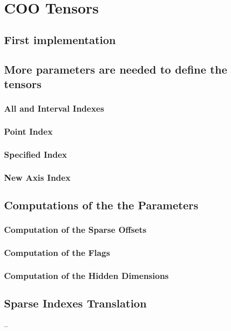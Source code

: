 \section{COO Tensors}
\subsection{First implementation}

\subsection{More parameters are needed to define the tensors}
\subsubsection{All and Interval Indexes}
\subsubsection{Point Index}
\subsubsection{Specified Index}
\subsubsection{New Axis Index}

\subsection{Computations of the the Parameters}
\subsubsection{Computation of the Sparse Offsets}
\subsubsection{Computation of the Flags}
\subsubsection{Computation of the Hidden Dimensions}

\subsection{Sparse Indexes Translation}
..